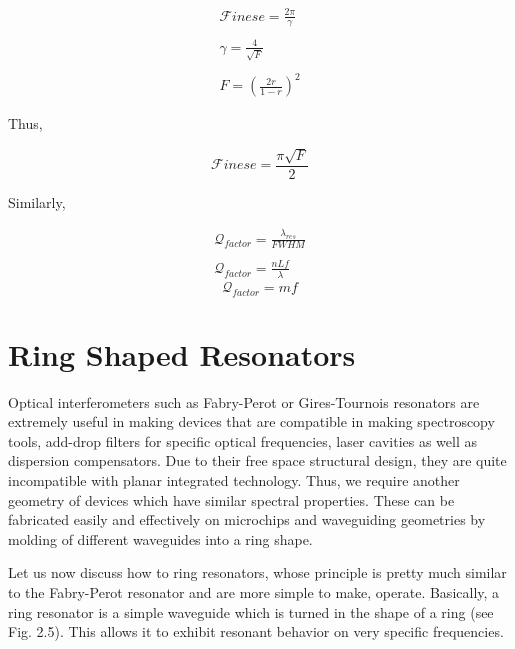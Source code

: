 \begin{align*}
{\mathcal F}inese = \frac{2 \pi}{\gamma} \\ 
\\
{\mathcal \gamma} = \frac{4}{\sqrt{F}} \\
\\
F = (\frac{2r}{1-r})^{2} 
\end{align*}

Thus,

\begin{equation}
{\mathcal F}inese = \frac{\pi \sqrt{F}}{2}
\end{equation}

Similarly, 

\begin{align*}
{\mathcal Q}_{factor} = \frac{\lambda_{res}}{FWHM} \\ 
\\
{\mathcal Q}_{factor} = \frac{nLf}{\lambda}
\end{align*}
\begin{equation}
{\mathcal Q}_{factor} = m f
\end{equation}


\section{Ring Shaped Resonators}
Optical interferometers such as Fabry-Perot or Gires-Tournois resonators are extremely useful in making devices that are compatible in making spectroscopy tools, add-drop filters for specific optical frequencies, laser cavities as well as dispersion compensators. Due to their free space structural design, they are quite incompatible with planar integrated technology. Thus, we require another geometry of devices which have similar spectral properties. These can be fabricated easily and effectively on microchips and waveguiding geometries by molding of different waveguides into a ring shape.

Let us now discuss how to ring resonators, whose principle is pretty much similar to the Fabry-Perot resonator and are more simple to make, operate. Basically, a ring resonator is a simple waveguide which is turned in the shape of a ring (see Fig. 2.5). This allows it to exhibit resonant behavior on very specific frequencies.



